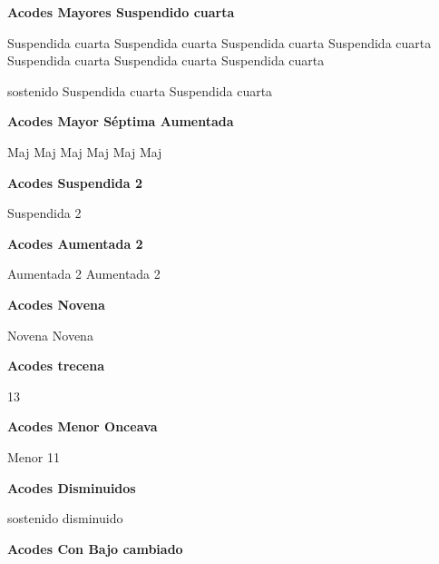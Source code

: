 \vskip 20pt
\textbf{Acodes Mayores Suspendido cuarta}
\vskip 25pt

\small
{} Suspendida cuarta
 Suspendida cuarta
 Suspendida cuarta
 Suspendida cuarta
 Suspendida cuarta
 Suspendida cuarta
 Suspendida cuarta

 sostenido Suspendida cuarta
 Suspendida cuarta
\normalsize

\vskip 20pt
\textbf{Acodes Mayor S\'eptima Aumentada}
\vskip 25pt

\small
{} Maj
 Maj
 Maj
 Maj
 Maj
 Maj
\normalsize

\vskip 20pt
\textbf{Acodes Suspendida 2}
\vskip 25pt

\small
{} Suspendida 2
\normalsize

\vskip 20pt
\textbf{Acodes Aumentada 2}
\vskip 25pt

\small
{} Aumentada 2
 Aumentada 2
\normalsize

\vskip 20pt
\textbf{Acodes Novena}
\vskip 25pt

\small
{} Novena
 Novena
\normalsize

\vskip 20pt
\textbf{Acodes trecena}
\vskip 25pt

\small
{} 13
\normalsize

\vskip 20pt
\textbf{Acodes Menor Onceava}
\vskip 25pt

\small
{} Menor 11
\normalsize

\vskip 20pt
\textbf{Acodes Disminuidos}
\vskip 25pt

\small
{} sostenido disminuido
\normalsize


\vskip 20pt
\textbf{Acodes Con Bajo cambiado}

